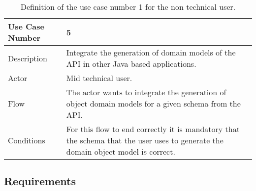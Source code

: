 \begin{table}[h]
    \begin{tabular}{ | m{2cm} | m{8cm}| }
        \hline
        Use Case Number & 5 \\
        \hline
        Description & Integrate the generation of domain models of the API in other Java based applications. \\
        \hline
        Actor & Mid technical user. \\
        \hline
        Flow & The actor wants to integrate the generation of object domain models for a given schema from the API. \\
        \hline
        Conditions & For this flow to end correctly it is mandatory that the schema that the user uses to
        generate the domain object model is correct. \\
        \hline
    \end{tabular}
    \caption[Definition of the use case number 1 for the non technical user]{Definition of the use case number 
    1 for the non technical user.}
\end{table}

\subsection{Requirements}